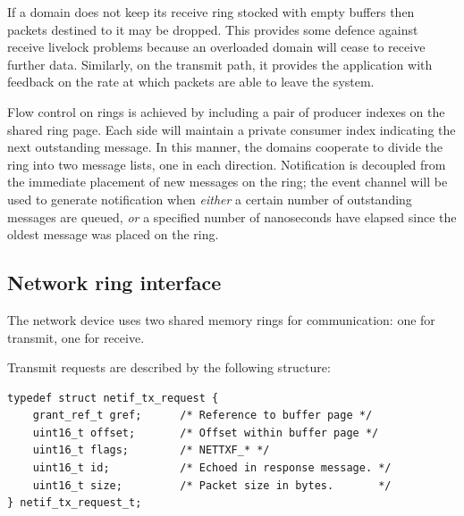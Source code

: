 \documentclass[11pt,twoside,final,openright,a4paper]{report}
\begin{document}

If a domain does not keep its receive ring stocked with empty buffers
then packets destined to it may be dropped.  This provides some
defence against receive livelock problems because an overloaded domain
will cease to receive further data.  Similarly, on the transmit path,
it provides the application with feedback on the rate at which packets
are able to leave the system.

Flow control on rings is achieved by including a pair of producer
indexes on the shared ring page.  Each side will maintain a private
consumer index indicating the next outstanding message.  In this
manner, the domains cooperate to divide the ring into two message
lists, one in each direction.  Notification is decoupled from the
immediate placement of new messages on the ring; the event channel
will be used to generate notification when {\em either} a certain
number of outstanding messages are queued, {\em or} a specified number
of nanoseconds have elapsed since the oldest message was placed on the
ring.



\subsection{Network ring interface}

The network device uses two shared memory rings for communication: one
for transmit, one for receive.

Transmit requests are described by the following structure:

\scriptsize
\begin{verbatim}
typedef struct netif_tx_request {
    grant_ref_t gref;      /* Reference to buffer page */
    uint16_t offset;       /* Offset within buffer page */
    uint16_t flags;        /* NETTXF_* */
    uint16_t id;           /* Echoed in response message. */
    uint16_t size;         /* Packet size in bytes.       */
} netif_tx_request_t;
\end{verbatim}
\normalsize
\end{document}
